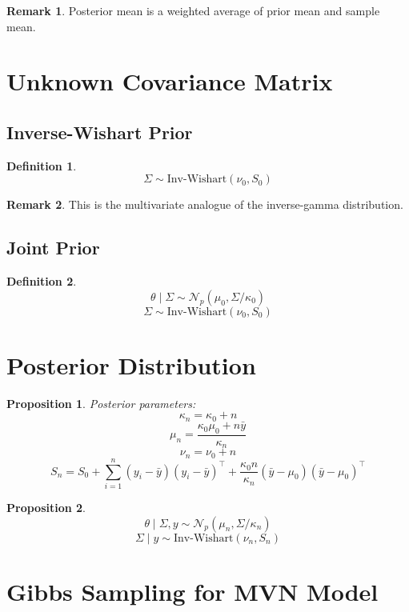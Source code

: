 \documentclass[12pt,oneside]{book}
\numberwithin{equation}{section}
\theoremstyle{definition}
\newtheorem{definition}{Definition}[section]
\newtheorem{remark}{Remark}[section]
\theoremstyle{plain}
\newtheorem{proposition}{Proposition}[section]
\theoremstyle{remark}
\newcommand{\Normal}{\mathcal{N}}
\begin{document}
\begin{remark}
Posterior mean is a weighted average of prior mean and sample mean.
\end{remark}

\section{Unknown Covariance Matrix}

\subsection{Inverse-Wishart Prior}

\begin{definition}
$$
\Sigma \sim \text{Inv-Wishart}(\nu_0, S_0)
$$
\end{definition}

\begin{remark}
This is the multivariate analogue of the inverse-gamma distribution.
\end{remark}

\subsection{Joint Prior}

\begin{definition}
$$
\theta \mid \Sigma \sim \Normal_p(\mu_0, \Sigma / \kappa_0)
$$
$$
\Sigma \sim \text{Inv-Wishart}(\nu_0, S_0)
$$
\end{definition}

\section{Posterior Distribution}

\begin{proposition}
Posterior parameters:
$$
\kappa_n = \kappa_0 + n
$$
$$
\mu_n = \frac{\kappa_0 \mu_0 + n \bar{y}}{\kappa_n}
$$
$$
\nu_n = \nu_0 + n
$$
$$
S_n =
S_0
+
\sum_{i=1}^n (y_i - \bar{y})(y_i - \bar{y})^\top
+
\frac{\kappa_0 n}{\kappa_n}(\bar{y} - \mu_0)(\bar{y} - \mu_0)^\top
$$
\end{proposition}

\begin{proposition}
$$
\theta \mid \Sigma, y \sim \Normal_p(\mu_n, \Sigma / \kappa_n)
$$
$$
\Sigma \mid y \sim \text{Inv-Wishart}(\nu_n, S_n)
$$
\end{proposition}

\section{Gibbs Sampling for MVN Model}
\end{document}
